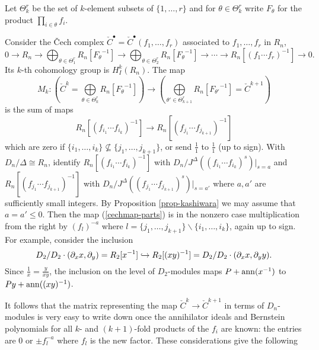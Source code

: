 \begin{definition}
Let $\Theta^r_k$
be the set of $k$-element subsets of $\{1,\ldots,r\}$ and
for $\theta\in \Theta^r_k$ write $F_\theta$ for the product $\prod_{i\in
\theta}f_{i}$.
\end{definition}
Consider the  \v Cech complex $\check C^\bullet=\check
C^\bullet(f_1,\ldots,f_r)$ associated to $f_1,\ldots,f_r$ in
$R_n$, 
\begin{equation}
0\to R_n\to \bigoplus_{\theta\in\Theta^r_1} R_n[{F_\theta}^{-1}]\to 
 \bigoplus_{\theta\in\Theta^r_2}R_n[{F_\theta}^{-1}]
 \to\cdots\to R_n[{(f_1\cdots f_r)}^{-1}]\to 0.
\end{equation}
Its $k$-th cohomology group is 
$H^k_I(R_n)$.
The map 
\begin{equation}
\label{cechmap}
M_k:\left(\check C^k=\bigoplus\limits_{\theta\in\Theta^r_k}
   R_n[{F_\theta}^{-1}]\right)\to 
\left(\bigoplus\limits_{\theta'\in\Theta^r_{k+1}}
   R_n[{F_{\theta'}}^{-1}]=\check C^{k+1} \right)
\end{equation}
 is the sum of maps
\begin{equation}
\label{cechmap-parts}
R_n[{(f_{i_1}\cdots f_{i_k})}^{-1}]\to R_n[{(f_{j_1}\dotsb
f_{j_{k+1}})}^{-1}]
\end{equation}
which are zero if $\{i_1,\ldots,i_k\}\not\subseteq
\{j_1,\ldots,j_{k+1}\}$, or send $\frac{1}{1}$ to
$\frac{1}{1}$ (up to sign). 
With $D_n/\Delta\cong R_n$, identify
$R_n[{(f_{i_1}\cdots f_{i_k})}^{-1}]$ with
$D_n/J^\Delta((f_{i_1}\cdots f_{i_k})^s)|_{s=a}$ and
$R_n[{(f_{j_1}\cdots f_{j_{k+1}})}^{-1}]$ with
$D_n/J^\Delta((f_{j_1}\cdots f_{j_{k+1}})^s)|_{s=a'}$ where
$a,a'$ are sufficiently small integers. By
Proposition \ref{prop-kashiwara} we may assume that $a=a'\le 0$. Then the map
(\ref{cechmap-parts}) is in the nonzero case multiplication from the right by
$(f_l)^{-a}$ where $l=\{j_1,\ldots,j_{k+1}\}\backslash \{i_1,\ldots,i_k\}$,
again up to sign. For example, consider the inclusion 
\[
D_2/D_2\cdot(\partial_xx,\partial_y)=R_2[x^{-1}]\hookrightarrow
R_2[(xy)^{-1}]=D_2/D_2\cdot (\partial_xx,
\partial_yy).
\]
Since $\frac{1}{x}
=\frac{y}{xy}$, the inclusion on the level of $D_2$-modules 
maps $P+\operatorname{ann}(x^{-1})$ to $Py+\operatorname{ann}((xy)^{-1})$.  

It follows that the matrix representing the map $\check C^k\to \check 
C^{k+1}$ in
terms of $D_n$-modules is very easy to write down once the annihilator
ideals and Bernstein polynomials for all $k$- and $(k+1)$-fold products
of the $f_i$ are known: the entries are 0 or $\pm f_l^{-a}$ where
$f_l$ is the new factor. These considerations give the following 

